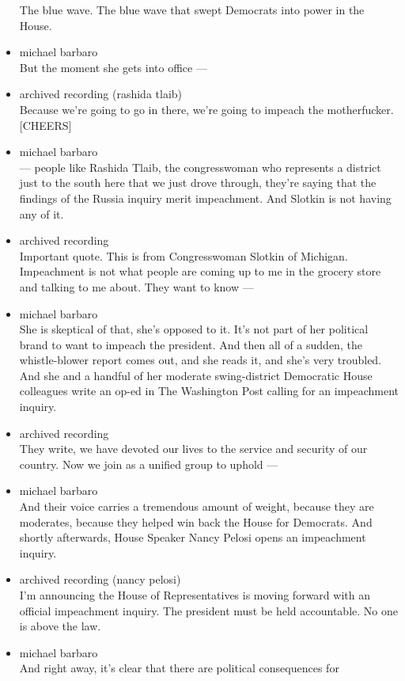 \begin{itemize}
  The blue wave. The blue wave that swept Democrats into power in the
  House.
\item
  michael barbaro\\
  But the moment she gets into office ---
\item
  archived recording (rashida tlaib)\\
  Because we're going to go in there, we're going to impeach the
  motherfucker. {[}CHEERS{]}
\item
  michael barbaro\\
  --- people like Rashida Tlaib, the congresswoman who represents a
  district just to the south here that we just drove through, they're
  saying that the findings of the Russia inquiry merit impeachment. And
  Slotkin is not having any of it.
\item
  archived recording\\
  Important quote. This is from Congresswoman Slotkin of Michigan.
  Impeachment is not what people are coming up to me in the grocery
  store and talking to me about. They want to know ---
\item
  michael barbaro\\
  She is skeptical of that, she's opposed to it. It's not part of her
  political brand to want to impeach the president. And then all of a
  sudden, the whistle-blower report comes out, and she reads it, and
  she's very troubled. And she and a handful of her moderate
  swing-district Democratic House colleagues write an op-ed in The
  Washington Post calling for an impeachment inquiry.
\item
  archived recording\\
  They write, we have devoted our lives to the service and security of
  our country. Now we join as a unified group to uphold ---
\item
  michael barbaro\\
  And their voice carries a tremendous amount of weight, because they
  are moderates, because they helped win back the House for Democrats.
  And shortly afterwards, House Speaker Nancy Pelosi opens an
  impeachment inquiry.
\item
  archived recording (nancy pelosi)\\
  I'm announcing the House of Representatives is moving forward with an
  official impeachment inquiry. The president must be held accountable.
  No one is above the law.
\item
  michael barbaro\\
  And right away, it's clear that there are political consequences for

\end{itemize}
